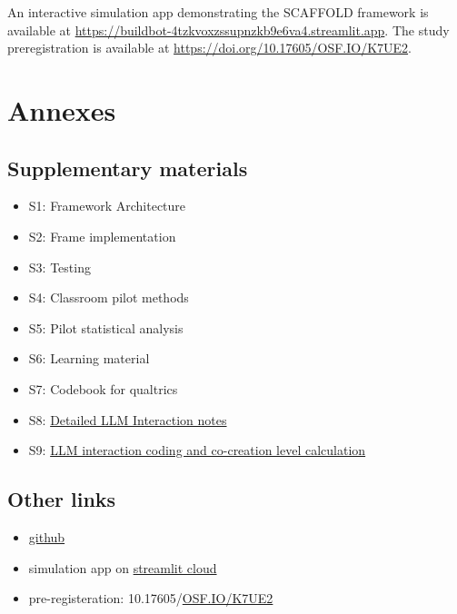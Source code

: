 \documentclass[fleqn,10pt]{wlscirep}
\begin{document}
An interactive simulation app demonstrating the SCAFFOLD framework is available at \href{https://buildbot-4tzkvoxzssupnzkb9e6va4.streamlit.app}{https://buildbot-4tzkvoxzssupnzkb9e6va4.streamlit.app}. The study preregistration is available at \href{https://doi.org/10.17605/OSF.IO/K7UE2}{https://doi.org/10.17605/OSF.IO/K7UE2}.



\section*{Annexes}

\subsection*{Supplementary materials}

\begin{itemize}
\item S1: Framework Architecture
\item S2: Frame implementation
\item S3: Testing
\item S4: Classroom pilot methods
\item S5: Pilot statistical analysis
\item S6: Learning material
\item S7: Codebook for qualtrics
\item S8: \href{https://docs.google.com/document/d/1H8ze6IJ8H7I5qsTjTcrK8b4FXwIk0rf9yr8sr4EKXkY/edit?tab=t.0}{Detailed LLM Interaction notes}
\item S9: \href{https://github.com/OlgaMuss/LLM_Frames_Paper/blob/main/Data_analysis/Data/BuildbotAnalysis\%20-\%20LLM\%20analysis.csv}{LLM interaction coding and co-creation level calculation}
\end{itemize}


\subsection*{Other links}

\begin{itemize}
\item \href{https://github.com/OlgaMuss/LLM_Frames_Paper}{github}
\item simulation app on \href{https://buildbot-4tzkvoxzssupnzkb9e6va4.streamlit.app}{streamlit cloud}
\item pre-registeration: 10.17605/\href{http://OSF.IO/K7UE2}{OSF.IO/K7UE2}
\end{itemize}
\end{document}
